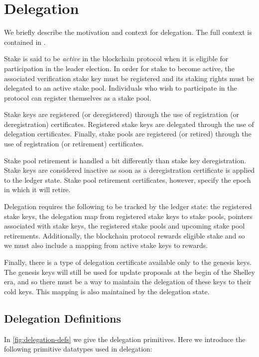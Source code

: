 \section{Delegation}
\label{sec:delegation-shelley}

We briefly describe the motivation and context for delegation.
The full context is contained in \cite{delegation_design}.

Stake is said to be \textit{active} in the blockchain protocol
when it is eligible for participation in the leader election. In order for
stake to become active,
the associated verification stake key must be registered
and its staking rights must be delegated to an active stake pool.
Individuals who wish to participate in the protocol can
register themselves as a stake pool.

Stake keys are registered (or deregistered) through the use of
registration (or deregistration) certificates.
Registered stake keys are delegated through the use of delegation certificates.
Finally, stake pools are registered (or retired) through the use of
registration (or retirement) certificates.

Stake pool retirement is handled a bit differently than stake key deregistration.
Stake keys are considered inactive as soon as a deregistration certificate
is applied to the ledger state.
Stake pool retirement certificates, however, specify the epoch in
which it will retire.

Delegation requires the following to be tracked by the ledger state:
the registered stake keys, the delegation map from registered stake keys to stake
pools, pointers associated with stake keys,
the registered stake pools and upcoming stake pool retirements.
Additionally, the blockchain protocol rewards eligible stake and so we must
also include a mapping from active stake keys to rewards.

Finally, there is a type of delegation certificate available only to the genesis
keys. The genesis keys will still be used for update proposals at the begin of the Shelley
era, and so there must be a way to maintain the delegation of these keys to their cold keys.
This mapping is also maintained by the delegation state.

\subsection{Delegation Definitions}
\label{sec:deleg-defs}

In \cref{fig:delegation-defs} we give the delegation primitives.
Here we introduce the following primitive datatypes used in delegation:


